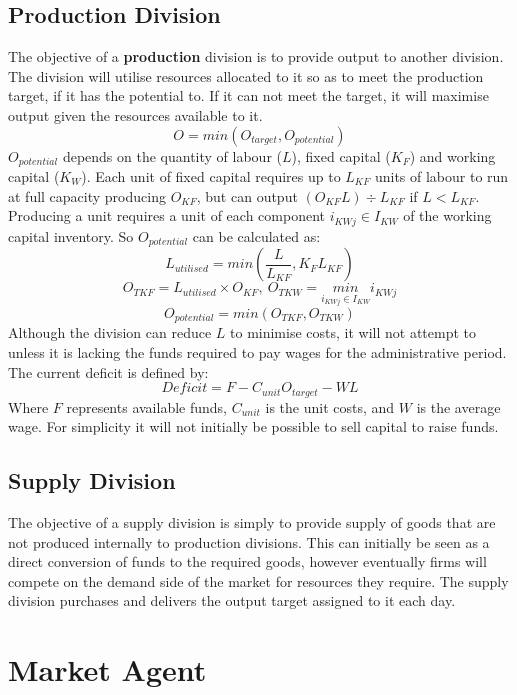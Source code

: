 \documentclass[11pt]{article}
\begin{document}
\subsection{Production Division}
The objective of a \textbf{production} division is to provide output to another division. The division will utilise resources allocated to it so as to meet the production target, if it has the potential to. If it can not meet the target, it will maximise output given the resources available to it.
\[
	O = min(O_{target}, O_{potential})
\]
$ O_{potential} $ depends on the quantity of labour ($ L $), fixed capital ($ K_F $) and working capital ($ K_W $). Each unit of fixed capital requires up to $ L_{KF} $ units of labour to run at full capacity producing $ O_{KF} $, but can output $ (O_{KF}L) \div L_{KF} $ if $ L < L_{KF} $. Producing a unit requires a unit of each component $ i_{KWj} \in I_{KW} $ of the working capital inventory. So $ O_{potential} $ can be calculated as:
\[
	L_{utilised} = min(\frac{L}{L_{KF}}, K_{F}L_{KF})
\]
\[
	O_{TKF} = L_{utilised} \times O_{KF},\ O_{TKW} = \underset{{i_{KWj} \in I_{KW}}}{min} i_{KWj}
\]
\[
	O_{potential} = min(O_{TKF}, O_{TKW})
\]
Although the division can reduce $ L $ to minimise costs, it will not attempt to unless it is lacking the funds required to pay wages for the administrative period. The current deficit is defined by:
\[
	Deficit = F - C_{unit}O_{target} - WL
\]
Where $ F $ represents available funds, $ C_{unit} $ is the unit costs, and $ W $ is the average wage. For simplicity it will not initially be possible to sell capital to raise funds.

\subsection{Supply Division}
The objective of a supply division is simply to provide supply of goods that are not produced internally to production divisions. This can initially be seen as a direct conversion of funds to the required goods, however eventually firms will compete on the demand side of the market for resources they require. The supply division purchases and delivers the output target assigned to it each day.

\section{Market Agent}
\end{document}
